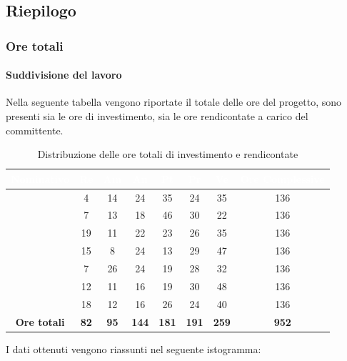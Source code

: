 \subsection{Riepilogo}
\subsubsection{Ore totali}
\paragraph{Suddivisione del lavoro}
Nella seguente tabella vengono riportate il totale delle ore del progetto, sono presenti sia le ore di investimento, sia le ore rendicontate a carico del committente.
\begin{table}[H]
	\begin{center}
		\begin{tabular}{ |c c c c c c c c| }
		\rowcolor{darkblue} 
		\textcolor{white}{\textbf{Nominativo}} & \textcolor{white}{\textbf{Re}} & \textcolor{white}{\textbf{Am}} & \textcolor{white}{\textbf{An}} & \textcolor{white}{\textbf{Pt}} & \textcolor{white}{\textbf{Pr}} & \textcolor{white}{\textbf{Ve}} & \textcolor{white}{\textbf{Ore Complessive}} \\ \hline
		\BL 	& 4  	& 14  	& 24 	& 35 	& 24 	& 35 	& 136 \\ \hline
		\FF 	& 7 	& 13 	& 18 	& 46 	& 30 	& 22 	& 136 \\ \hline
		\MM 	& 19  	& 11  	& 22 	& 23 	& 26 	& 35  	& 136 \\ \hline
		\PC 	& 15 	& 8  	& 24 	& 13 	& 29	& 47 	& 136 \\ \hline
		\TG 	& 7  	& 26 	& 24 	& 19 	& 28 	& 32 	& 136 \\ \hline
		\TL 	& 12  	& 11 	& 16 	& 19 	& 30 	& 48 	& 136 \\ \hline
		\VD 	& 18  	& 12  	& 16 	& 26 	& 24 	& 40 	& 136 \\ \hline
		\textbf{Ore totali} & \textbf{82} & \textbf{95} & \textbf{144} & \textbf{181} & \textbf{191} & \textbf{259} & \textbf{952} \\ \hline
		\end{tabular}
	\caption{Distribuzione delle ore totali di investimento e rendicontate}
	\end{center}
\end{table}
I dati ottenuti vengono riassunti nel seguente istogramma:
